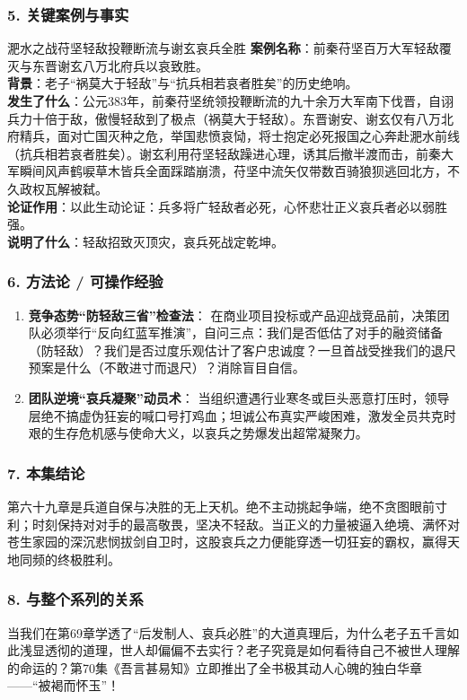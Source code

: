 \subsubsection{5. 关键案例与事实}
\begin{CaseBox}{淝水之战苻坚轻敌投鞭断流与谢玄哀兵全胜}
\textbf{案例名称}：前秦苻坚百万大军轻敌覆灭与东晋谢玄八万北府兵以哀致胜。\\
\textbf{背景}：老子“祸莫大于轻敌”与“抗兵相若哀者胜矣”的历史绝响。\\
\textbf{发生了什么}：公元383年，前秦苻坚统领投鞭断流的九十余万大军南下伐晋，自诩兵力十倍于敌，傲慢轻敌到了极点（祸莫大于轻敌）。东晋谢安、谢玄仅有八万北府精兵，面对亡国灭种之危，举国悲愤哀恸，将士抱定必死报国之心奔赴淝水前线（抗兵相若哀者胜矣）。谢玄利用苻坚轻敌躁进心理，诱其后撤半渡而击，前秦大军瞬间风声鹤唳草木皆兵全面踩踏崩溃，苻坚中流矢仅带数百骑狼狈逃回北方，不久政权瓦解被弑。\\
\textbf{论证作用}：以此生动论证：兵多将广轻敌者必死，心怀悲壮正义哀兵者必以弱胜强。\\
\textbf{说明了什么}：轻敌招致灭顶灾，哀兵死战定乾坤。
\end{CaseBox}

\subsubsection{6. 方法论 / 可操作经验}
\begin{enumerate}
    \item \textbf{竞争态势“防轻敌三省”检查法}：
    在商业项目投标或产品迎战竞品前，决策团队必须举行“反向红蓝军推演”，自问三点：我们是否低估了对手的融资储备（防轻敌）？我们是否过度乐观估计了客户忠诚度？一旦首战受挫我们的退尺预案是什么（不敢进寸而退尺）？消除盲目自信。
    \item \textbf{团队逆境“哀兵凝聚”动员术}：
    当组织遭遇行业寒冬或巨头恶意打压时，领导层绝不搞虚伪狂妄的喊口号打鸡血；坦诚公布真实严峻困难，激发全员共克时艰的生存危机感与使命大义，以哀兵之势爆发出超常凝聚力。
\end{enumerate}

\subsubsection{7. 本集结论}
第六十九章是兵道自保与决胜的无上天机。绝不主动挑起争端，绝不贪图眼前寸利；时刻保持对对手的最高敬畏，坚决不轻敌。当正义的力量被逼入绝境、满怀对苍生家园的深沉悲悯拔剑自卫时，这股哀兵之力便能穿透一切狂妄的霸权，赢得天地同频的终极胜利。

\subsubsection{8. 与整个系列的关系}
当我们在第69章学透了“后发制人、哀兵必胜”的大道真理后，为什么老子五千言如此浅显透彻的道理，世人却偏偏不去实行？老子究竟是如何看待自己不被世人理解的命运的？第70集《吾言甚易知》立即推出了全书极其动人心魄的独白华章——“被褐而怀玉”！

